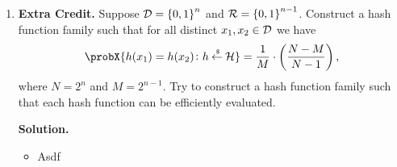 \documentclass[11pt]{article}
\newcommand{\nextoddpage}{\checkoddpage\ifoddpage{\ \newpage\ \newpage}\else{\ \newpage}\fi}
\begin{document}
\begin{enumerate}
  {\bfseries Solution.} 
  \begin{itemize} 
  \item Asdf
  \end{itemize}



\nextoddpage 
\item {\bfseries Extra Credit.} 
  Suppose ${\mathcal D}={\{0,1\}}^n$ and ${\mathcal R}={\{0,1\}}^{n-1}$. 
  Construct a hash function family such that for all distinct $x_1,x_2\in{\mathcal D}$ we have 
  $$\probX{h(x_1)=h(x_2)\colon h\getsr\cH} = \frac1M \cdot\left(\frac{N-M}{N-1}\right),$$
  where $N=2^n$ and $M=2^{n-1}$.  
  Try to construct a hash function family such that each hash function can be efficiently evaluated. 
  
  {\bfseries Solution.} 
  \begin{itemize} 
  \item Asdf
  \end{itemize}
 



\end{enumerate}
\end{document}

